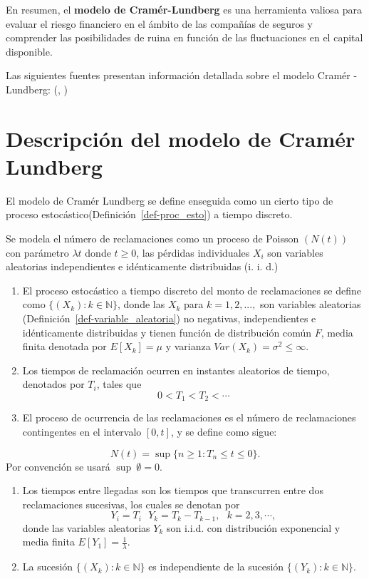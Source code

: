 \documentclass[
  us-letterpaper,
]{scrreprt}
\theoremstyle{plain}
\theoremstyle{plain}
\theoremstyle{definition}
\theoremstyle{remark}
\begin{document}
En resumen, el \textbf{modelo de Cramér-Lundberg} es una herramienta
valiosa para evaluar el riesgo financiero en el ámbito de las compañías
de seguros y comprender las posibilidades de ruina en función de las
fluctuaciones en el capital disponible.

Las siguientes fuentes presentan información detallada sobre el modelo
Cramér - Lundberg: (\autocite{asmussen2010ruin},
\autocite{dickson1998ruin})

\section{Descripción del modelo de Cramér
Lundberg}\label{descripciuxf3n-del-modelo-de-cramuxe9r-lundberg}

El modelo de Cramér Lundberg se define enseguida como un cierto tipo de
proceso estocástico(Definición~\ref{def-proc_esto}) a tiempo discreto.

Se modela el número de reclamaciones como un proceso de Poisson
\((N(t))\) con parámetro \(\lambda t\) donde \(t\geq 0\), las pérdidas
individuales \(X_i\) son variables aleatorias independientes e
idénticamente distribuidas (i. i. d.)

\begin{enumerate}
\def\labelenumi{\arabic{enumi}.}
\item
  El proceso estocástico a tiempo discreto del monto de reclamaciones se
  define como \(\{(X_k):{k \in \mathbb{N} }\}\), donde las \(X_k\) para
  \(k = 1, 2, ...,\) son variables aleatorias
  (Definición~\ref{def-variable_aleatoria}) no negativas, independientes
  e idénticamente distribuidas y tienen función de distribución común
  \(F\), media finita denotada por \(E[X_k] = \mu\) y varianza
  \(Var(X_k) = \sigma^2 \leq \infty\).
\item
  Los tiempos de reclamación ocurren en instantes aleatorios de tiempo,
  denotados por \(T_i\), tales que \[ 0 < T_1 < T_2 < \dotsb\]
\item
  El proceso de ocurrencia de las reclamaciones es el número de
  reclamaciones contingentes en el intervalo \([0,t]\), y se define como
  sigue:
\end{enumerate}

\[N(t) = \sup \{n \geq 1: T_n \leq t  \leq 0\}.\] Por convención se
usará \(\sup \ \emptyset = 0\).

\begin{enumerate}
\def\labelenumi{\arabic{enumi}.}
\setcounter{enumi}{3}
\item
  Los tiempos entre llegadas son los tiempos que transcurren entre dos
  reclamaciones sucesivas, los cuales se denotan por
  \[Y_i = T_i \ \ \ Y_k= T_k - T_{k-1}, \ \ \ k = 2,3, \dotsb,\]donde
  las variables aleatorias \(Y_k\) son i.i.d. con distribución
  exponencial y media finita \(E[Y_1] =\frac{1}{\lambda}\).
\item
  La sucesión \(\{(X_k): k \in \mathbb{N}\}\) es independiente de la
  sucesión \(\{(Y_k):k\in \mathbb{N}\}.\)
\end{enumerate}
\end{document}
